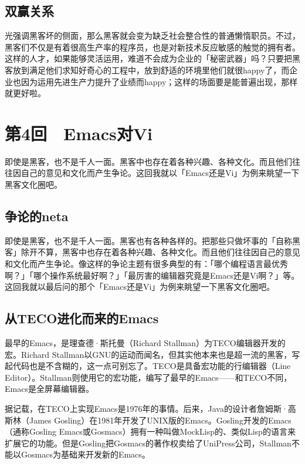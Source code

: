 \documentclass[a4paper,12pt]{article}
\begin{document}
\subsection{双赢关系}

光强调黑客坏的侧面，那么黑客就会变为缺乏社会整合性的普通懒惰职员。不过，黑客们不仅是有着很高生产率的程序员，也是对新技术反应敏感的触觉的拥有者。这样的人才，如果能够灵活运用，难道不会成为企业的「秘密武器」吗？只要把黑客放到满足他们求知好奇心的工程中，放到舒适的环境里他们就很happy了，而企业也因为运用先进生产力提升了业绩而happy；这样的场面要是能普遍出现，那样就更好啦。


\section{第4回　Emacs对Vi}

即使是黑客，也不是千人一面。黑客中也存在着各种兴趣、各种文化。而且他们往往因自己的意见和文化而产生争论。这回我就以「Emacs还是Vi」为例来眺望一下黑客文化圈吧。

\subsection{争论的neta}

即使是黑客，也不是千人一面。黑客也有各种各样的。把那些只做坏事的「自称黑客」除开不算，黑客中也存在着各种兴趣、各种文化。而且他们往往因自己的意见和文化而产生争论。像这样的争论主题有很多典型的有：「哪个编程语言最优秀啊？」「哪个操作系统最好啊？」「最厉害的编辑器究竟是Emacs还是Vi啊？」等。这回我就以最后问的那个「Emacs还是Vi」为例来眺望一下黑客文化圈吧。

\subsection{从TECO进化而来的Emacs}

最早的Emacs，是理查德·斯托曼（Richard Stallman）为TECO编辑器开发的宏。Richard Stallman以GNU的运动而闻名，但其实他本来也是超一流的黑客，写起代码也是不含糊的，这一点可别忘了。TECO是具备宏功能的行编辑器（Line Editor）。Stallman则使用它的宏功能，编写了最早的Emacs——和TECO不同，Emacs是全屏幕编辑器。

据记载，在TECO上实现Emacs是1976年的事情。后来，Java的设计者詹姆斯·高斯林（James Gosling）在1981年开发了UNIX版的Emacs。Gosling开发的Emacs（通称Gosling Emacs或Gosmacs）拥有一种叫做MockLisp的、类似Lisp的语言来扩展它的功能。但是Gosling把Gosmacs的著作权卖给了UniPress公司，Stallman不能以Gosmacs为基础来开发新的Emacs。
\end{document}
